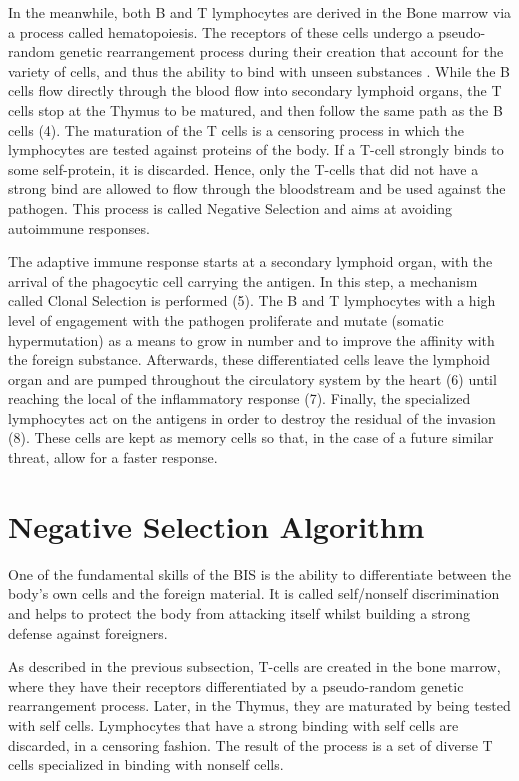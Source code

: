 In the meanwhile, both B and T lymphocytes are derived in the Bone marrow via a process called hematopoiesis. The receptors of these cells undergo a pseudo-random genetic rearrangement process during their creation that account for the variety of cells, and thus the ability to bind with unseen substances \cite{AIS2014}. While the B cells flow directly through the blood flow into secondary lymphoid organs, the T cells stop at the Thymus to be matured, and then follow the same path as the B cells (4). The maturation of the T cells is a censoring process in which the lymphocytes are tested against proteins of the body. If a T-cell strongly binds to some self-protein, it is discarded. Hence, only the T-cells that did not have a strong bind are allowed to flow through the bloodstream and be used against the pathogen. This process is called Negative Selection and aims at avoiding autoimmune responses.

The adaptive immune response starts at a secondary lymphoid organ, with the arrival of the phagocytic cell carrying the antigen. In this step, a mechanism called Clonal Selection is performed (5). The B and T lymphocytes with a high level of engagement with the pathogen proliferate and mutate (somatic hypermutation) as a means to grow in number and to improve the affinity with the foreign substance. Afterwards, these differentiated cells leave the lymphoid organ and are pumped throughout the circulatory system by the heart (6) until reaching the local of the inflammatory response (7). Finally, the specialized lymphocytes act on the antigens in order to destroy the residual of the invasion (8). These cells are kept as memory cells so that, in the case of a future similar threat, allow for a faster response. 

\section{Negative Selection Algorithm} \label{sec:bgNSA}

One of the fundamental skills of the BIS is the ability to differentiate between the body's own cells and the foreign material. It is called self/nonself discrimination \cite{NSAResearch2021} and helps to protect the body from attacking itself whilst building a strong defense against foreigners. 

As described in the previous subsection, T-cells are created in the bone marrow, where they have their receptors differentiated by a pseudo-random genetic rearrangement process. Later, in the Thymus, they are maturated by being tested with self cells. Lymphocytes that have a strong binding with self cells are discarded, in a censoring fashion. The result of the process is a set of diverse T cells specialized in binding with nonself cells.

